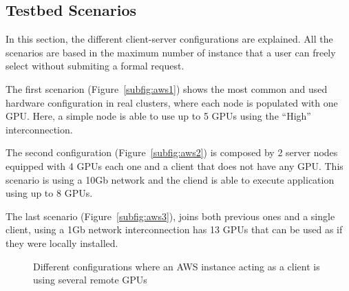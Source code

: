 \documentclass[a4paper,twoside]{article}
\begin{document}
\subsection{Testbed Scenarios}
In this section, the different client-server configurations 
are explained. All the scenarios are based in the maximum number of instance 
that a user can freely select without submiting a formal request.

The first scenarion (Figure~\ref{subfig:aws1}) shows the most common 
and used hardware configuration in real clusters, where each node is 
populated with one GPU. Here, a simple node is able to use up to 5 GPUs 
using the ``High'' interconnection. 

The second configuration (Figure~\ref{subfig:aws2}) is composed by 2 server nodes equipped 
with 4 GPUs each one and a client that does not have any GPU. This scenario is using 
a 10Gb network and the cliend is able to execute application using up to 8 GPUs.

The last scenario (Figure~\ref{subfig:aws3}), joins both previous ones and a single client, 
using a 1Gb network interconnection has 13 GPUs that can be used as if they were locally installed.


\begin{figure}[ht]
\centering
{}
\quad
{}
\caption{Different configurations where an AWS instance acting as a client is using several remote GPUs}
\label{fig:aws}
\end{figure}
\end{document}
